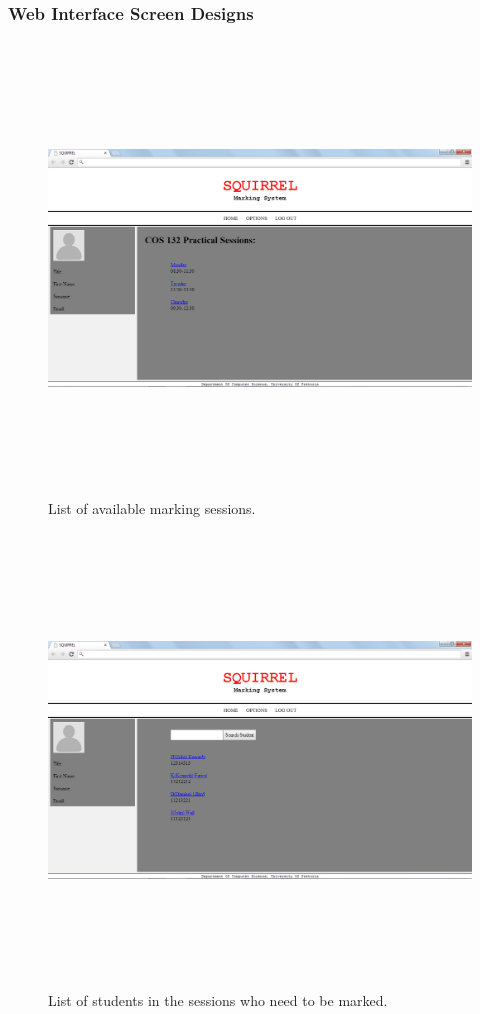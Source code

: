 \documentclass[12pt]{article}
\begin{document}
	\pagebreak	
	
	\subsubsection{Web Interface Screen Designs}
	
		\begin{figure}[htbp]
		\centering
		\includegraphics[width=1.0\linewidth, height=12cm]{./Diagrams/web_markerSessions}
		\caption{List of available marking sessions.}
		\label{fig:web_markerSessions}
		\end{figure}
			
		\begin{figure}[htbp]
		\centering
		\includegraphics[width=1.0\linewidth, height=12cm]{./Diagrams/web_searchStudent}
		\caption{List of students in the sessions who need to be marked.}
		\label{fig:web_searchStudent}
		\end{figure}
			
\end{document}
